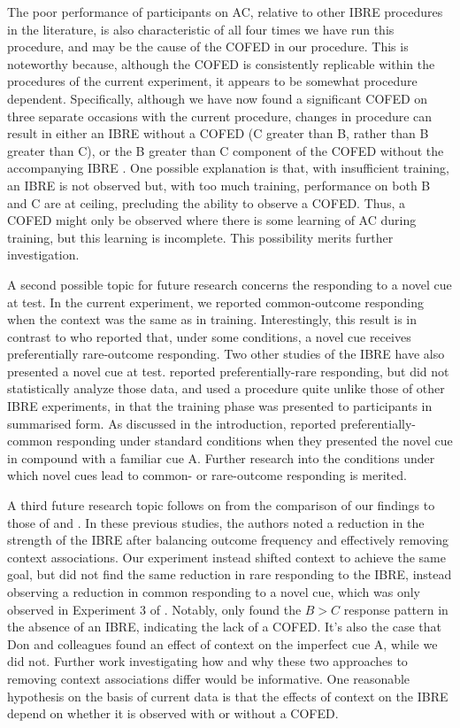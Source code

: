 \documentclass[twocolumn]{article}
\begin{document}
{The poor performance of participants on AC, relative to other IBRE procedures in the literature, is also characteristic of all four times we have run this procedure, and may be the cause of the COFED in our procedure. This is noteworthy because, although the COFED is consistently replicable within the procedures of the current experiment, it appears to be somewhat procedure dependent. Specifically, although we have now found a significant COFED on three separate occasions with the current procedure, changes in procedure can result in either an IBRE without a COFED (C greater than B, rather than B greater than C), or the B greater than C component of the COFED without the accompanying IBRE \citep{Inkster2019}. One possible explanation is that, with insufficient training, an IBRE is not observed but, with too much training, performance on both B and C are at ceiling, precluding the ability to observe a COFED. Thus, a COFED might only be observed where there is some learning of AC during training, but this learning is incomplete. This possibility merits further investigation.

A second possible topic for future research concerns the responding to a novel cue at test. In the current experiment, we reported common-outcome responding when the context was the same as in training. Interestingly, this result is in contrast to \cite{Juslin2001} who reported that, under some conditions, a novel cue receives preferentially rare-outcome responding. Two other studies of the IBRE have also presented a novel cue at test. \cite{Johansen2007} reported preferentially-rare responding, but did not statistically analyze those data, and used a procedure quite unlike those of other IBRE experiments, in that the training phase was presented to participants in summarised form. As discussed in the introduction, \cite{Don2017} reported preferentially-common responding under standard conditions when they presented the novel cue in compound with a familiar cue A. Further research into the conditions under which novel cues lead to common- or rare-outcome responding is merited. 

A third future research topic follows on from the comparison of our findings to those of \cite{Don2017} and \cite{Don2019}. In these previous studies, the authors noted a reduction in the strength of the IBRE after balancing outcome frequency and effectively removing context associations. Our experiment instead shifted context to achieve the same goal, but did not find the same reduction in rare responding to the IBRE, instead observing a reduction in common responding to a novel cue, which was only observed in Experiment 3 of \cite{Don2017}. Notably, \cite{Don2017} only found the $B > C$ response pattern in the absence of an IBRE, indicating the lack of a COFED. It's also the case that Don and colleagues found an effect of context on the imperfect cue A, while we did not. Further work investigating how and why these two approaches to removing context associations differ would be informative. One reasonable hypothesis on the basis of current data is that the effects of context on the IBRE depend on whether it is observed with or without a COFED.

}
\end{document}
